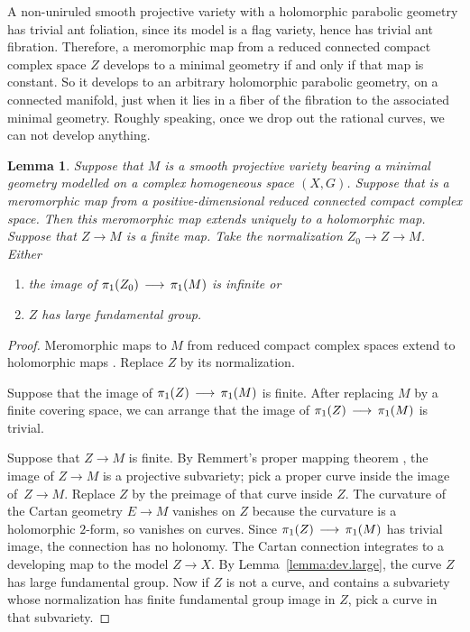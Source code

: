 \documentclass[11pt]{article}
\numberwithin{equation}{section}
\numberwithin{equation}{section}
\newtheorem{Lemma}[Theorem]{Lemma}
\begin{document}
\begin{Example}
A non-uniruled smooth projective variety with a holomorphic parabolic geometry has trivial ant foliation, since its model is a flag variety, hence has trivial ant fibration.
Therefore, a meromorphic map from a reduced connected compact complex space $Z$ develops to a minimal geometry if and only if that map is constant.
So it develops to an arbitrary holomorphic parabolic geometry, on a connected manifold, just when it lies in a fiber of the fibration to the associated minimal geometry.
Roughly speaking, once we drop out the rational curves, we can not develop anything.
\end{Example}

\begin{Lemma}\label{lemma:large}
Suppose that $M$ is a smooth projective variety bearing a minimal geometry modelled on a complex homogeneous space $(X, G)$.
Suppose that  is a meromorphic map from a positive-dimensional reduced connected compact complex space.
Then this meromorphic map extends uniquely to a holomorphic map.
Suppose that $Z \to M$ is a finite map.
Take the normalization $Z_0 \to Z \to M$.
Either
\begin{enumerate}\itemsep=0pt
\item[$(1)$]
the image of $\pi_{1}({Z_0}) \,\longrightarrow\, \pi_{1}({M})$ is infinite or
\item[$(2)$]
$Z$ has large fundamental group.
\end{enumerate}
\end{Lemma}

\begin{proof}
Meromorphic maps to $M$ from reduced compact complex spaces extend to holomorphic maps \cite[Lemma 26]{Biswas.McKay:2016}.
Replace $Z$ by its normalization.

Suppose that the image of $\pi_{1}({Z}) \,\longrightarrow\, \pi_{1}({M})$ is finite.
After replacing $M$ by a finite covering space, we can arrange that the image of $\pi_{1}({Z})
\,\longrightarrow\, \pi_{1}({M})$ is trivial.

Suppose that $Z \to M$ is finite.
By Remmert's proper mapping theorem \cite[p.~213]{Grauert.Remmert:1984}, the image of $Z
 \to M$ is a projective subvariety;
pick a proper curve inside the image of~${Z \to M}$.
Replace $Z$ by the preimage of that curve inside $Z$.
The curvature of the Cartan geometry ${E \to M}$ vanishes on $Z$ because the curvature is a holomorphic $2$-form, so vanishes on curves.
Since $\pi_{1}({Z}) \,\longrightarrow\, \pi_{1}({M})$ has trivial image, the connection has no holonomy.
The Cartan connection integrates to a developing map to the model $Z \to X$.
By Lemma~\ref{lemma:dev.large}, the curve $Z$ has large fundamental group.
Now if $Z$ is not a curve, and contains a subvariety whose normalization has
finite fundamental group image in $Z$, pick a curve in that subvariety.
\end{proof}
\end{document}
